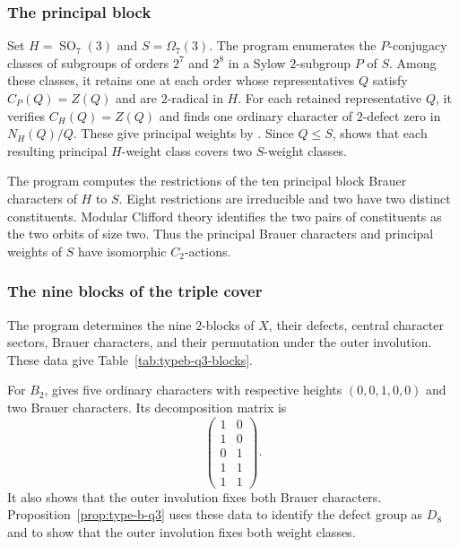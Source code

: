 \documentclass[10pt]{amsart}
\theoremstyle{definition}
\renewcommand{\leq}{\leqslant}
\numberwithin{equation}{section}
\numberwithin{table}{section}
\begin{document}
\subsubsection{The principal block}

Set $H=\operatorname{SO}_7(3)$ and $S=\Omega_7(3)$.
The program  enumerates the $P$-conjugacy
classes of subgroups of orders $2^7$ and $2^8$ in a Sylow
$2$-subgroup $P$ of $S$. Among these classes, it retains one at each
order whose representatives $Q$ satisfy $C_P(Q)=Z(Q)$ and are
$2$-radical in $H$. For each retained representative $Q$, it verifies
$C_H(Q)=Z(Q)$ and finds one ordinary character of $2$-defect zero in
$N_H(Q)/Q$.
These give principal weights by \cite[Lemma~2.3]{FengYuZhang2024}.
Since $Q\leq S$, \cite[Corollary~2.22(2)]{FengYuZhang2024} shows that
each resulting principal $H$-weight class covers two $S$-weight classes.

The program  computes the
restrictions of the ten principal block Brauer characters of $H$ to $S$.
Eight restrictions are irreducible and two have two distinct constituents.
Modular Clifford theory identifies the two pairs of constituents as the two
orbits of size two.  Thus the principal Brauer characters and principal
weights of $S$ have isomorphic $C_2$-actions.

\subsubsection{The nine blocks of the triple cover}

The program  determines the nine $2$-blocks of $X$,
their defects, central character sectors, Brauer characters, and their
permutation under the outer involution.  These data give
Table~\ref{tab:typeb-q3-blocks}.

For $B_2$,  gives five ordinary characters with
respective heights $(0,0,1,0,0)$ and two Brauer characters.  Its
decomposition matrix is
\[
 \begin{pmatrix}1&0\\1&0\\0&1\\1&1\\1&1\end{pmatrix}.
\]
It also shows that the outer involution fixes both Brauer characters.
Proposition~\ref{prop:type-b-q3} uses these data to identify the defect
group as $D_8$ and to show that the outer involution fixes both weight
classes.
\end{document}
